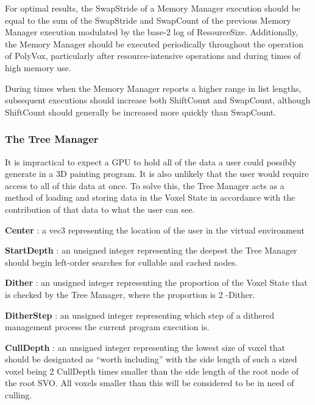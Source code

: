 \documentclass[onecolumn, draftclsnofoot,10pt, compsoc]{IEEEtran}
\newcounter{threesection}[subsubsection]
\begin{document}

For optimal results, the SwapStride of a Memory Manager execution should be equal to the sum of the SwapStride and SwapCount of the previous Memory Manager execution modulated by the base-2 log of ResourceSize. Additionally, the Memory Manager should be executed periodically throughout the operation of PolyVox, particularly after resource-intensive operations and during times of high memory use.

During times when the Memory Manager reports a higher range in list lengths, subsequent executions should increase both ShiftCount and SwapCount, although ShiftCount should generally be increased more quickly than SwapCount.


\subsubsection{The Tree Manager}


It is impractical to expect a GPU to hold all of the data a user could possibly generate in a 3D painting program. It is also unlikely that the user would require access to all of this data at once. To solve this, the Tree Manager acts as a method of loading and storing data in the Voxel State in accordance with the contribution of that data to what the user can see. 


\noindent \textbf{Center} : a vec3 representing the location of the user in the virtual environment

\noindent \textbf{StartDepth} : an unsigned integer representing the deepest the Tree Manager should begin left-order searches for cullable and cached nodes.

\noindent \textbf{Dither} : an unsigned integer representing the proportion of the Voxel State that is checked by the Tree Manager, where the proportion is 2 -Dither.

\noindent \textbf{DitherStep} : an unsigned integer representing which step of a dithered management process the current program execution is.

\noindent \textbf{CullDepth} : an unsigned integer representing the lowest size of voxel that should be designated as “worth including” with the side length of such a sized voxel being 2 CullDepth times smaller than the side length of the root node of the root SVO. All voxels smaller than this will be considered to be in need of culling.
\end{document}
